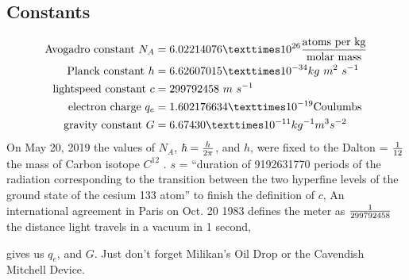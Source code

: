 \begin{multicols}{2}

\section{Constants}\begin{align*}%
\text{Avogadro constant } N_A&=6.02214076×10^{26} {\text{atoms per kg} \over \text{molar mass}}\\
\text{Planck constant } h&= 6.62607015 × 10^{-34} kg~m^2~ s^{-1}\\
\text{lightspeed constant } c&=299792458 ~m~s^{-1}\\
\text{electron charge }q_e&=1.602176634 × 10^{-19} \text{Coulumbs}\\
\text{gravity constant }G&=6.674 30 × 10^{-11}kg^{-1} m^3 s^{-2}
\end{align*}
On May 20, 2019 the values of $N_A$, $\hbar ={{h} \over {2\pi }} $, and $h$, were fixed to the Dalton = ${1 \over 12}$ the mass of Carbon isotope $C^{12}$  \citep{Horst1}. 
$s$ = ``duration of 9192631770 periods of the radiation corresponding to the transition between the two hyperfine levels of the ground state of the cesium 133 atom''\citep{CGPM13} %
to finish the definition of $c$, An international agreement in Paris on Oct. 20 1983 defines the meter as $1\over 299792458$ the distance light travels in a vacuum in 1 second\citep{newspaper_1983}, %

\citep{RevModPhys.93.025010} gives us $q_e$, and $G$. Just don't forget Milikan's Oil Drop or the Cavendish Mitchell Device. 

\end{multicols}
